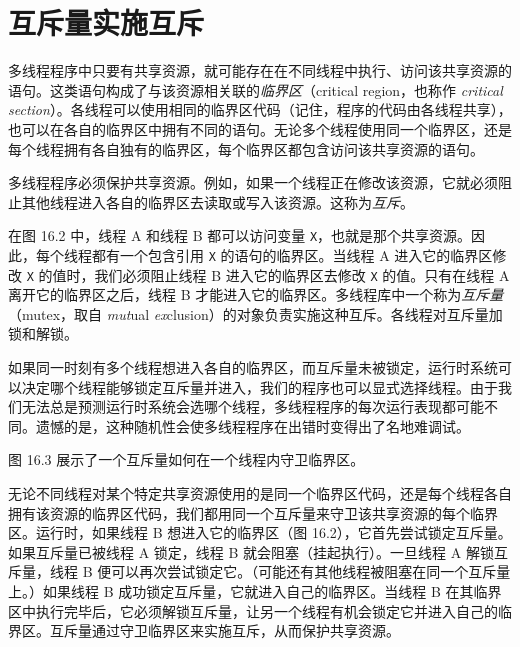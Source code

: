 \section{互斥量实施互斥}

多线程程序中只要有共享资源，就可能存在在不同线程中执行、访问该共享资源的语句。这类语句构成了与该资源相关联的\emph{临界区}（critical region，也称作 \emph{critical section}）。各线程可以使用相同的临界区代码（记住，程序的代码由各线程共享），也可以在各自的临界区中拥有不同的语句。无论多个线程使用同一个临界区，还是每个线程拥有各自独有的临界区，每个临界区都包含访问该共享资源的语句。

多线程程序必须保护共享资源。例如，如果一个线程正在修改该资源，它就必须阻止其他线程进入各自的临界区去读取或写入该资源。这称为\emph{互斥}。


在图 16.2 中，线程 A 和线程 B 都可以访问变量 \texttt{X}，也就是那个共享资源。因此，每个线程都有一个包含引用 \texttt{X} 的语句的临界区。当线程 A 进入它的临界区修改 \texttt{X} 的值时，我们必须阻止线程 B 进入它的临界区去修改 \texttt{X} 的值。只有在线程 A 离开它的临界区之后，线程 B 才能进入它的临界区。多线程库中一个称为\emph{互斥量}（mutex，取自 \emph{mut}ual \emph{ex}clusion）的对象负责实施这种互斥。各线程对互斥量加锁和解锁。


如果同一时刻有多个线程想进入各自的临界区，而互斥量未被锁定，运行时系统可以决定哪个线程能够锁定互斥量并进入，我们的程序也可以显式选择线程。由于我们无法总是预测运行时系统会选哪个线程，多线程程序的每次运行表现都可能不同。遗憾的是，这种随机性会使多线程程序在出错时变得出了名地难调试。

图 16.3 展示了一个互斥量如何在一个线程内守卫临界区。


无论不同线程对某个特定共享资源使用的是同一个临界区代码，还是每个线程各自拥有该资源的临界区代码，我们都用同一个互斥量来守卫该共享资源的每个临界区。运行时，如果线程 B 想进入它的临界区（图 16.2），它首先尝试锁定互斥量。如果互斥量已被线程 A 锁定，线程 B 就会阻塞（挂起执行）。一旦线程 A 解锁互斥量，线程 B 便可以再次尝试锁定它。（可能还有其他线程被阻塞在同一个互斥量上。）如果线程 B 成功锁定互斥量，它就进入自己的临界区。当线程 B 在其临界区中执行完毕后，它必须解锁互斥量，让另一个线程有机会锁定它并进入自己的临界区。互斥量通过守卫临界区来实施互斥，从而保护共享资源。

